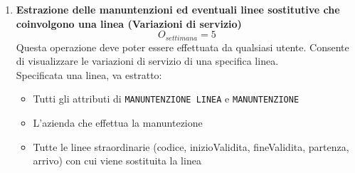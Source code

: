 \documentclass[12pt,a4paper]{report}
\begin{document}
\begin{enumerate}[label=\textbf{\arabic*}]
    \item \textbf{Estrazione delle manuntenzioni ed eventuali linee sostitutive che coinvolgono una linea (Variazioni di servizio)} \label{op8} \\
	\[{O_{settimana} = 5}\]
	Questa operazione deve poter essere effettuata da qualsiasi utente. Consente di visualizzare le variazioni di servizio di una specifica linea.\\
	Specificata una linea, va estratto:
	\begin{itemize}
	\renewcommand\labelitemi{--}
	    \item Tutti gli attributi di \texttt{MANUNTENZIONE LINEA} e \texttt{MANUNTENZIONE}
	    \item L'azienda che effettua la manuntezione
	    \item Tutte le linee straordinarie (codice, inizioValidita, fineValidita, partenza, arrivo) con cui viene sostituita la linea
	\end{itemize}


\end{enumerate}
\end{document}
